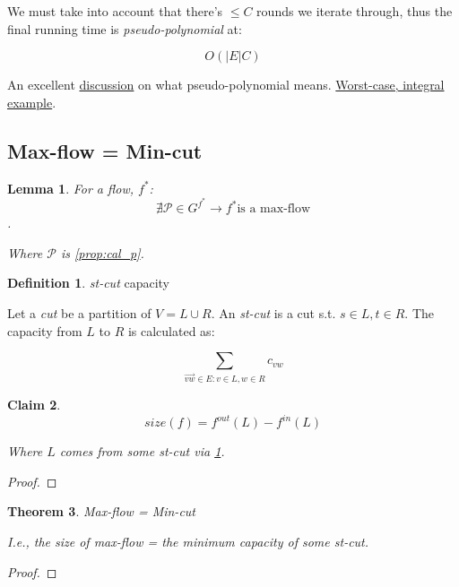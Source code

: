 \documentclass{article}
\newtheorem{theorem}{Theorem}[section]
\newtheorem{claim}[theorem]{Claim}
\newtheorem{lemma}[theorem]{Lemma}
\theoremstyle{definition}
\newtheorem{definition}{Definition}[section]
\begin{document}
We must take into account that there's $\leq C$ rounds we iterate through, thus the final running time is \textit{pseudo-polynomial} at:

$$O(|E|C)$$

An excellent \href{https://stackoverflow.com/questions/19649026/is-network-flow-pseudo-polynomial-time}{discussion} on what pseudo-polynomial means. \href{https://en.wikipedia.org/wiki/Ford%E2%80%93Fulkerson_algorithm#Integral_example}{Worst-case, integral example}.

\subsection{Max-flow = Min-cut}
\begin{lemma}
\label{lem:aug_path}
For a flow, $f^*$: $$\nexists \mathcal{P} \in G^{f^*} \to f^* \text{is a max-flow}$$.
	
Where $\mathcal{P}$ is \ref{prop:cal_p}.
\end{lemma}

\begin{definition}{\textit{st-cut} capacity}
\label{def:st_cut_cap}

Let a \textit{cut} be a partition of $V = L \cup R$. An \textit{st-cut} is a cut s.t. $s \in L, t \in R$. The capacity from $L$ to $R$ is calculated as:

$$\sum_{\overrightarrow{vw} \in E : v \in L, w \in R} c_{vw}$$
\end{definition}

\begin{claim}
$$size(f) = f^{out} (L) - f^{in} (L)$$

Where $L$ comes from some \textit{st-cut} via \ref{def:st_cut_cap}.
\end{claim}
\begin{proof}

\end{proof}

\begin{theorem}{Max-flow = Min-cut}
\label{thm:maxflowmincut}

I.e., the size of max-flow = the minimum capacity of some \textit{st-cut}.
\end{theorem}

\begin{proof}

\end{proof}
\end{document}
